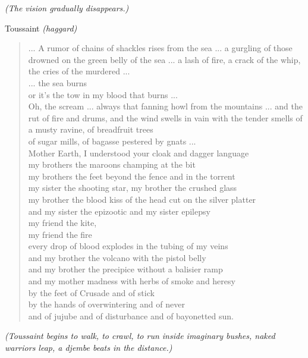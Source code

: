\documentclass[letterpaper,article,12pt,oneside,notitlepage]{memoir}
\begin{document}
\textit{(The vision gradually disappears.)}

\begin{center}Toussaint \textit{(haggard)}\end{center}

\begin{verse}
... A rumor of chains of shackles rises from the sea ... a gurgling of those drowned on the green belly of the sea ... a lash of fire, a crack of the whip, the cries of the murdered ...  \\
... the sea burns \\
or it's the tow in my blood that burns ... \\
Oh, the scream ... always that fanning howl from the mountains ... and the rut of fire and drums, and the wind swells in vain with the tender smells of a musty ravine, of breadfruit trees  \\
of sugar mills, of bagasse pestered by gnats ... \\
Mother Earth, I understood your cloak and dagger language \\
my brothers the maroons champing at the bit \\
my brothers the feet beyond the fence and in the torrent \\
my sister the shooting star, my brother the crushed glass \\
my brother the blood kiss of the head cut on the silver platter \\
and my sister the epizootic and my sister epilepsy \\
my friend the kite, \\
my friend the fire \\
every drop of blood explodes in the tubing of my veins \\
and my brother the volcano with the pistol belly \\
and my brother the precipice without a balisier ramp \\
and my mother madness with herbs of smoke and heresy \\
by the feet of Crusade and of stick \\
by the hands of overwintering and of never \\
and of jujube and of disturbance and of bayonetted sun. \\
\end{verse}

\textit{(Toussaint begins to walk, to crawl, to run inside imaginary bushes, naked warriors leap, a djembe beats in the distance.)}
\end{document}
